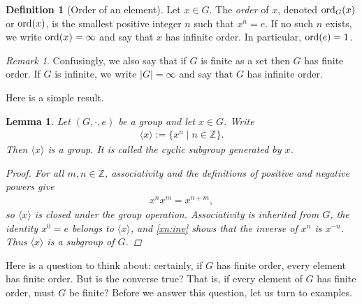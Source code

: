 \documentclass[reqno,11pt]{amsart}
\theoremstyle{definition}
\newtheorem{definition}{Definition}[section]
\theoremstyle{plain}
\newtheorem{lemma}{Lemma}[section]
\theoremstyle{remark}
\newtheorem*{remark}{Remark}
\numberwithin{equation}{section}
\newcommand{\Z}{\mathbb{Z}}
\newcommand{\be}{\begin{eqnarray}}
\newcommand{\ee}{\end{eqnarray}}
\begin{document}
\begin{definition}[Order of an element]
Let $x\in G$. The \emph{order} of $x$, denoted $\mathrm{ord}_G(x)$ or $\mathrm{ord}(x)$,
is the smallest positive integer $n$ such that $x^n=e$. If no such $n$
exists, we write $\mathrm{ord}(x)=\infty$ and say that $x$ has infinite order. In
particular, $\mathrm{ord}(e)=1$.
\end{definition}
	
\begin{remark} Confusingly, we also say that if $G$ is finite as a set then $G$ has finite order. If $G$ is infinite, we write $|G|=\infty$ and say that
$G$ has infinite order. \end{remark} 


Here is a simple result.

\begin{lemma}
Let $(G,\cdot,e)$ be a group and let $x\in G$. Write
\be
\langle x\rangle:=\{x^n\mid n\in\Z\}.
\ee
Then $\langle x\rangle$ is a group. It is called the \emph{cyclic
subgroup generated by $x$}.

\begin{proof}
For all $m,n\in\Z$, associativity and the definitions of positive and
negative powers give
\be
x^n x^m=x^{n+m},
\ee
so $\langle x\rangle$ is closed under the group operation. Associativity is
inherited from $G$, the identity $x^0=e$ belongs to $\langle x\rangle$, and
\eqref{xn:inv} shows that the inverse of $x^n$ is $x^{-n}$. Thus
$\langle x\rangle$ is a subgroup of $G$.
\end{proof}
\end{lemma}

Here is a question to think about: certainly, if $G$ has finite order, every
element has finite order. But is the converse true? That is, if every element
of $G$ has finite order, must $G$ be finite? Before we answer this question,
let us turn to examples.
\end{document}
